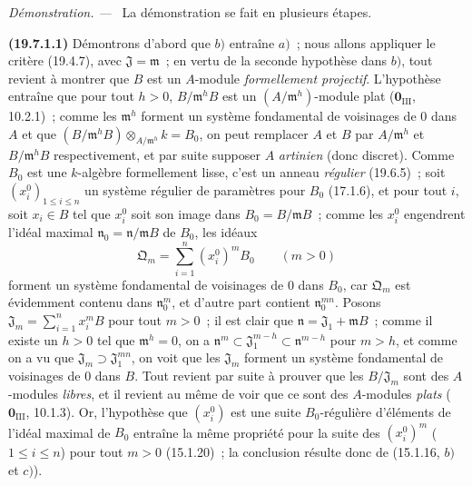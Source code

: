 \documentclass[10pt,oneside]{book}
\newenvironment{proof}{%
  \par\medskip\noindent\textit{Démonstration. ---\ }}{\par}
\begin{document}
\begin{proof}
La démonstration se fait en plusieurs étapes.

\medskip
\noindent{}\label{0.19.7.1.1-fr}\textbf{(19.7.1.1)}\enspace
Démontrons d'abord que $b)$ entraîne $a)$~; nous allons appliquer le critère
(19.4.7), avec $\mathfrak J=\mathfrak m$~; en vertu de la seconde hypothèse
dans $b)$, tout revient à montrer que $B$ est un $A$-module
\emph{formellement projectif}. L'hypothèse entraîne que pour tout $h>0$,
$B/\mathfrak m^hB$ est un $(A/\mathfrak m^h)$-module plat
($\mathbf 0_{\mathrm{III}}$, 10.2.1)~; comme les $\mathfrak m^h$ forment un
système fondamental de voisinages de 0 dans $A$ et que
$(B/\mathfrak m^hB)\otimes_{A/\mathfrak m^h}k=B_0$, on peut remplacer $A$ et
$B$ par $A/\mathfrak m^h$ et $B/\mathfrak m^hB$ respectivement, et par suite
supposer $A$ \emph{artinien} (donc discret). Comme $B_0$ est une $k$-algèbre
formellement lisse, c'est un anneau \emph{régulier} (19.6.5)~; soit
$(x_i^0)_{1\leq i\leq n}$ un système régulier de paramètres pour $B_0$
(17.1.6), et pour tout $i$, soit $x_i\in B$ tel que $x_i^0$ soit son image
dans $B_0=B/\mathfrak mB$~; comme les $x_i^0$ engendrent l'idéal maximal
$\mathfrak n_0=\mathfrak n/\mathfrak mB$ de $B_0$, les idéaux
\[
  \mathfrak Q_m=\sum_{i=1}^n(x_i^0)^mB_0 \qquad (m>0)
\]
forment un système fondamental de voisinages de 0 dans $B_0$, car
$\mathfrak Q_m$ est évidemment contenu dans $\mathfrak n_0^m$, et d'autre
part contient $\mathfrak n_0^{mn}$. Posons
$\mathfrak J_m=\sum_{i=1}^n x_i^mB$ pour tout $m>0$~; il est clair que
$\mathfrak n=\mathfrak J_1+\mathfrak mB$~; comme il existe un $h>0$ tel que
$\mathfrak m^h=0$, on a
$\mathfrak n^m\subset\mathfrak J_1^{m-h}\subset\mathfrak n^{m-h}$ pour
$m>h$, et comme on a vu que $\mathfrak J_m\supset\mathfrak J_1^{mn}$, on voit
que les $\mathfrak J_m$ forment un système fondamental de voisinages de 0 dans
$B$. Tout revient par suite à prouver que les $B/\mathfrak J_m$ sont des
$A$-modules \emph{libres}, et il revient au même de voir que ce sont des
$A$-modules \emph{plats} ($\mathbf 0_{\mathrm{III}}$, 10.1.3). Or,
l'hypothèse que $(x_i^0)$ est une suite $B_0$-régulière d'éléments de l'idéal
maximal de $B_0$ entraîne la même propriété pour la suite des $(x_i^0)^m$
($1\leq i\leq n$) pour tout $m>0$ (15.1.20)~; la conclusion résulte donc de
(15.1.16, $b)$ et $c)$).
\end{proof}
\end{document}
